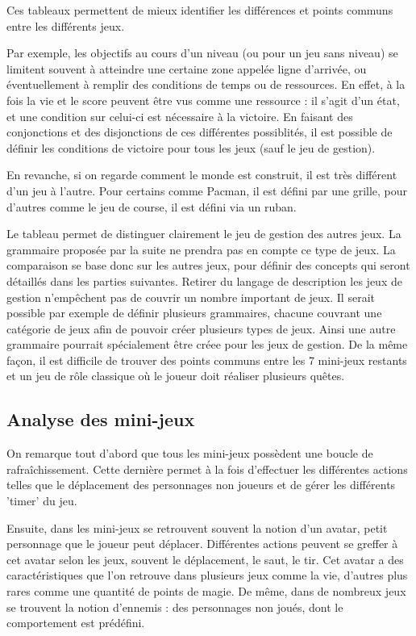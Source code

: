 \vspace{0.5cm}

Ces tableaux permettent de mieux identifier les différences et points communs entre les différents jeux.

Par exemple, les objectifs au cours d'un niveau (ou pour un jeu sans niveau) se limitent souvent à atteindre une certaine zone
appelée ligne d'arrivée, ou éventuellement à remplir des conditions de temps ou de ressources. En effet, à la fois la vie et le score
peuvent être vus comme une ressource : il s'agit d'un état, et une condition sur celui-ci est nécessaire à la victoire.
En faisant des conjonctions et des disjonctions de ces différentes possiblités, il est possible de définir 
les conditions de victoire pour tous les jeux (sauf le jeu de gestion).

En revanche, si on regarde comment le monde est construit, il est très différent d'un jeu à l'autre.
Pour certains comme Pacman, il est défini par une grille, pour d'autres comme le jeu de course, il est défini via un ruban.

Le tableau permet de distinguer clairement le jeu de gestion des autres jeux.
La grammaire proposée par la suite ne prendra pas en compte ce type de jeux.
La comparaison se base donc sur les autres jeux, pour définir des concepts qui seront détaillés dans les parties suivantes.
Retirer du langage de description les jeux de gestion n'empêchent pas de couvrir un nombre important de jeux.
Il serait possible par exemple de définir plusieurs grammaires, chacune couvrant une catégorie de jeux afin de pouvoir
créer plusieurs types de jeux. Ainsi une autre grammaire pourrait spécialement être créee pour les jeux de gestion.
De la même façon, il est difficile de trouver des points communs entre les 7 mini-jeux restants et un jeu de rôle classique où le joueur
doit réaliser plusieurs quêtes.

\subsection{Analyse des mini-jeux}

On remarque tout d'abord que tous les mini-jeux possèdent une boucle de rafraîchissement.
Cette dernière permet à la fois d'effectuer les différentes actions telles que le déplacement des personnages non joueurs et de gérer 
les différents 'timer' du jeu.

Ensuite, dans les mini-jeux se retrouvent souvent la notion d'un avatar, petit personnage que le joueur peut déplacer.
Différentes actions peuvent se greffer à cet avatar selon les jeux, souvent le déplacement, le saut, le tir.
Cet avatar a des caractéristiques que l'on retrouve dans plusieurs jeux comme la vie, d'autres plus rares comme une quantité de points de magie.
De même, dans de nombreux jeux se trouvent la notion d'ennemis : des personnages non joués, dont le comportement est prédéfini.

